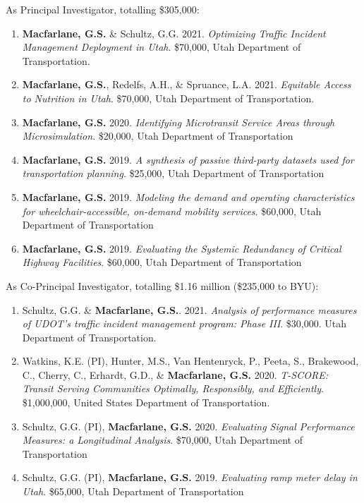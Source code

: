 \documentclass[margin,line]{res}
\newcounter{enuminitialize}
\newenvironment{myenum}[1][]
{%
 \setcounter{enuminitialize}{#1}
 \addtocounter{enuminitialize}{2}
 \begin{enumerate}[left= 4pt, itemsep=12pt, start=\value{enuminitialize}, label=\arabic*\addtocounter{enumi}{-2}]
}
{%
 \end{enumerate}
}
\begin{document}
\begin{resume}
As Principal Investigator, totalling \$305,000:
\vspace{0.3cm}
\begin{myenum}[6]
  \item {\textbf{Macfarlane, G.S.} \& Schultz, G.G. 2021. \textit{Optimizing Traffic Incident Management Deployment in Utah}. \$70,000, Utah Department of Transportation.}
  \item {\textbf{Macfarlane, G.S.}, Redelfs, A.H., \& Spruance, L.A. 2021. \textit{Equitable Access to Nutrition in Utah}. \$70,000, Utah Department of Transportation.}
  \item {\textbf{Macfarlane, G.S.} 2020. \textit{ Identifying Microtransit Service Areas
through Microsimulation}. \$20,000, Utah Department of Transportation}
  \item {\textbf{Macfarlane, G.S.} 2019. \textit{ A synthesis of passive third-party datasets
used for transportation planning}. \$25,000, Utah Department of Transportation}
  \item {\textbf{Macfarlane, G.S.} 2019. \textit{ Modeling the demand and operating
characteristics for wheelchair-accessible, on-demand mobility services}.
\$60,000, Utah Department of Transportation}
  \item {\textbf{Macfarlane, G.S.} 2019. \textit{ Evaluating the Systemic Redundancy of
Critical Highway Facilities}. \$60,000, Utah Department of Transportation}
\end{myenum}

As Co-Principal Investigator, totalling \$1.16 million (\$235,000 to BYU):
\vspace{0.3cm}
\begin{myenum}[4]
  \item{Schultz, G.G. \& \textbf{Macfarlane, G.S.}. 2021. \textit{Analysis of
  performance measures of UDOT’s traffic incident management program: Phase
  III}. \$30,000. Utah Department of Transportation.}
  \item{Watkins, K.E. (PI), Hunter, M.S., Van Hentenryck, P., Peeta, S.,
  Brakewood, C., Cherry, C., Erhardt, G.D., \& \textbf{Macfarlane, G.S.} 2020. \textit{
  T-SCORE: Transit Serving Communities Optimally, Responsibly, and Efficiently}.
  \$1,000,000, United States Department of Transportation.}
  \item{ Schultz, G.G. (PI), \textbf{Macfarlane, G.S.} 2020. \textit{ Evaluating Signal
  Performance Measures: a Longitudinal Analysis}. \$70,000, Utah Department of
  Transportation}
  \item{ Schultz, G.G. (PI), \textbf{Macfarlane, G.S.} 2019. \textit{ Evaluating ramp meter
delay in Utah}. \$65,000, Utah Department of Transportation}
\end{myenum}


\end{resume}
\end{document}
